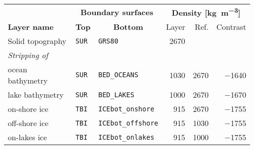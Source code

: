 \begingroup\setlength{\fboxsep}{0pt}
\colorbox{tablebackground}{%
\begin{tabular}{lllrrr}
    \toprule   
    {} & \multicolumn{2}{c}{\textbf{Boundary surfaces}}  & \multicolumn{3}{c}{\textbf{Density [\si{\kilo \gram \per \cubic \metre}]}}\\
        \cmidrule{2-3}
        \cmidrule{4-6}
        \textbf{Layer name} & \multicolumn{1}{c}{\textbf{Top}} & \multicolumn{1}{c}{\textbf{Bottom}} & Layer & Ref. & Contrast \\
    \midrule
    Solid topography &
    \texttt{SUR} & \texttt{GRS80} &
    \num{2670} & & \\

    \textit{Stripping of} & & & & \\

    \quad ocean bathymetry &
    \texttt{SUR} & \texttt{BED\_OCEANS} &
    \num{1030} & \num{2670} & \num{-1640} \\

    \quad lake bathymetry &
    \texttt{SUR} & \texttt{BED\_LAKES} &
    \num{1000} & \num{2670} & \num{-1670} \\

    \quad on-shore ice &
    \texttt{TBI} & \texttt{ICEbot\_onshore} &
    \num{915} & \num{2670} & \num{-1755} \\

    \quad off-shore ice &
    \texttt{TBI} & \texttt{ICEbot\_offshore} &
    \num{915} & \num{1030} & \num{-1755} \\

    \quad on-lakes ice &
    \texttt{TBI} & \texttt{ICEbot\_onlakes} &
    \num{915} & \num{1000} & \num{-1755} \\
    \bottomrule
\end{tabular}
}\endgroup
